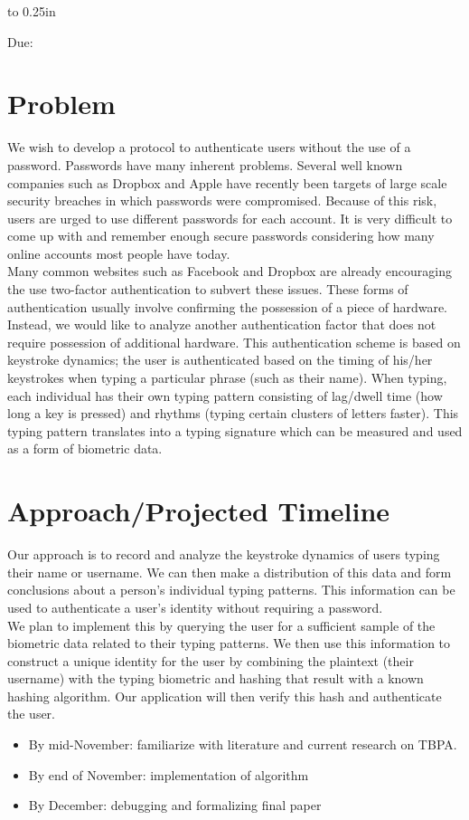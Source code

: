 \documentclass[letterpaper,12pt]{article}
\newcommand{\htitle}
{
    \vbox to 0.25in{}
    \noindent\parbox{\textwidth}
    {
        \student\hfill \assigndate\newline
        \coursename\hfill 
        Due: \duedate \vspace*{-.5ex}\newline
        \mbox{}\hrulefill\mbox{}
    }
    \vspace{8pt}
    \begin{center}{\Large\bf{\settitle}}\end{center}
}
\newcommand{\handout}
{
    \thispagestyle{empty}
    \markboth{}{}
    \pagestyle{plain}
    \htitle
}
\begin{document}
\handout
\setlength{\parindent}{0pt}

\section{Problem}
We wish to develop a protocol to authenticate users without the use of a password. Passwords have many inherent problems. Several well known companies such as Dropbox and Apple have recently been targets of large scale security breaches in which passwords were compromised. Because of this risk, users are urged to use different passwords for each account. It is very difficult to come up with and remember enough secure passwords considering how many online accounts most people have today.\\

Many common websites such as Facebook and Dropbox are already encouraging the use two-factor authentication to subvert these issues. These forms of authentication usually involve confirming the possession of a piece of hardware. Instead, we would like to analyze another authentication factor that does not require possession of additional hardware. This authentication scheme is based on keystroke dynamics; the user is authenticated based on the timing of his/her keystrokes when typing a particular phrase (such as their name). When typing, each individual has their own typing pattern consisting of lag/dwell time (how long a key is pressed) and rhythms (typing certain clusters of letters faster).  This typing pattern translates into a typing signature which can be measured and used as a form of biometric data.   


\section{Approach/Projected Timeline}
Our approach is to record and analyze the keystroke dynamics of users typing their name or username.  We can then make a distribution of this data and form conclusions about a person's individual typing patterns.  This information can be used to authenticate a user's identity without requiring a password.  \\

We plan to implement this by querying the user for a sufficient sample of the biometric data related to their typing patterns.  We then use this information to construct a unique identity for the user by combining the plaintext (their username) with the typing biometric and hashing that result with a known hashing algorithm.  Our application will then verify this hash and authenticate the user.
\begin{itemize}
\item By mid-November: familiarize with literature and current research on TBPA.
\item By end of November: implementation of algorithm
\item By December: debugging and formalizing final paper
\end{itemize}
\end{document}

